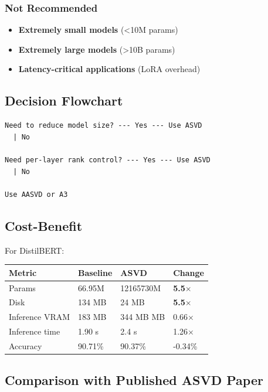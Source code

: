 \subsubsection{Not Recommended}

\begin{itemize}
\item \textbf{Extremely small models} (\textless{}10M params)
\item \textbf{Extremely large models} (\textgreater{}10B params)
\item \textbf{Latency-critical applications} (LoRA overhead)

\end{itemize}
\subsection{Decision Flowchart}

\begin{lstlisting}
Need to reduce model size? --- Yes --- Use ASVD
  | No
   
Need per-layer rank control? --- Yes --- Use ASVD
  | No
   
Use AASVD or A3
\end{lstlisting}

\subsection{Cost-Benefit}

For DistilBERT:

\begin{table}[H]
\centering
\small
\begin{tabular}{llll}
\toprule
\textbf{Metric} & \textbf{Baseline} & \textbf{ASVD} & \textbf{Change} \\
\midrule
Params & 66.95M & 12165730M & \textbf{5.5$\times$} \\
Disk & 134 MB & 24 MB & \textbf{5.5$\times$} \\
Inference VRAM & 183 MB & 344 MB MB & 0.66$\times$ \\
Inference time & 1.90 s & 2.4 s & 1.26$\times$ \\
Accuracy & 90.71\% & 90.37\% & -0.34\% \\
\bottomrule
\end{tabular}
\end{table}

\subsection{Comparison with Published ASVD Paper}

